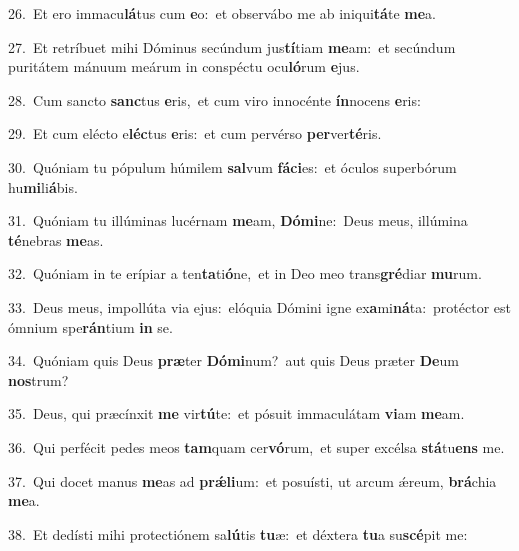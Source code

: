 {\numbfont\textcolor{\numbcolor}{26.}}~Et ero immacu\-\textbf{lá}\-tus cum \textbf{e}\-o:~\star et observábo me ab iniqui\-\textbf{tá}\-te \textbf{me}\-a.\par
{\numbfont\textcolor{\numbcolor}{27.}}~Et retríbuet mihi Dóminus secúndum jus\-\textbf{tí}\-tiam \textbf{me}\-am:~\star et secúndum puritátem mánuum meárum in conspéctu ocu\-\textbf{ló}\-rum \textbf{e}\-jus.\par
{\numbfont\textcolor{\numbcolor}{28.}}~Cum sancto \textbf{sanc}\-tus \textbf{e}\-ris,~\star et cum viro innocénte \textbf{ín}\-nocens \textbf{e}\-ris:\par
{\numbfont\textcolor{\numbcolor}{29.}}~Et cum elécto e\-\textbf{léc}\-tus \textbf{e}\-ris:~\star et cum pervérso \textbf{per}\-ver\-\textbf{té}\-ris.\par
{\numbfont\textcolor{\numbcolor}{30.}}~Quóniam tu pópulum húmilem \textbf{sal}\-vum \textbf{fá}\-\textbf{ci}es:~\star et óculos superbórum hu\-\textbf{mi}\-li\-\textbf{á}\-bis.\par
{\numbfont\textcolor{\numbcolor}{31.}}~Quóniam tu illúminas lucérnam \textbf{me}\-am, \textbf{Dó}\-\textbf{mi}ne:~\star Deus meus, illúmina \textbf{té}\-nebras \textbf{me}\-as.\par
{\numbfont\textcolor{\numbcolor}{32.}}~Quóniam in te erípiar a ten\-\textbf{ta}\-ti\-\textbf{ó}\-ne,~\star et in Deo meo trans\-\textbf{gré}\-diar \textbf{mu}\-rum.\par
{\numbfont\textcolor{\numbcolor}{33.}}~Deus meus, impollúta via ejus:~\dagger elóquia Dómini igne ex\-\textbf{a}\-mi\-\textbf{ná}\-ta:~\star protéctor est ómnium spe\-\textbf{rán}\-tium \textbf{in} se.\par
{\numbfont\textcolor{\numbcolor}{34.}}~Quóniam quis Deus \textbf{præ}\-ter \textbf{Dó}\-\textbf{mi}num?~\star aut quis Deus præter \textbf{De}\-um \textbf{nos}\-trum?\par
{\numbfont\textcolor{\numbcolor}{35.}}~Deus, qui præcínxit \textbf{me} vir\-\textbf{tú}\-te:~\star et pósuit immaculátam \textbf{vi}\-am \textbf{me}\-am.\par
{\numbfont\textcolor{\numbcolor}{36.}}~Qui perfécit pedes meos \textbf{tam}\-quam cer\-\textbf{vó}\-rum,~\star et super excélsa \textbf{stá}\-tu\textbf{ens} me.\par
{\numbfont\textcolor{\numbcolor}{37.}}~Qui docet manus \textbf{me}\-as ad \textbf{prǽ}\-\textbf{li}um:~\star et posuísti, ut arcum ǽreum, \textbf{brá}\-chia \textbf{me}\-a.\par
{\numbfont\textcolor{\numbcolor}{38.}}~Et dedísti mihi protectiónem sa\-\textbf{lú}\-tis \textbf{tu}\-æ:~\star et déxtera \textbf{tu}\-a su\-\textbf{scé}\-pit me:\par
